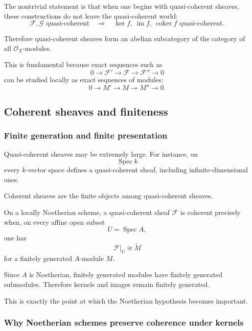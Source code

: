 The nontrivial statement is that when one begins with quasi-coherent sheaves, these constructions do not leave the quasi-coherent world:
\[
\mathcal{F},\mathcal{G}\text{ quasi-coherent}
\quad\Longrightarrow\quad
\ker f,\ \operatorname{im} f,\ \operatorname{coker} f\text{ quasi-coherent}.
\]

Therefore quasi-coherent sheaves form an abelian subcategory of the category of all \(\mathcal{O}_X\)-modules.

This is fundamental because exact sequences such as
\[
0\longrightarrow\mathcal{F}'
\longrightarrow\mathcal{F}
\longrightarrow\mathcal{F}''
\longrightarrow 0
\]
can be studied locally as exact sequences of modules:
\[
0\longrightarrow M'
\longrightarrow M
\longrightarrow M''
\longrightarrow 0.
\]

\subsection{Coherent sheaves and finiteness}

\subsubsection{Finite generation and finite presentation}

Quasi-coherent sheaves may be extremely large. For instance, on
\[
\operatorname{Spec} k
\]
every \(k\)-vector space defines a quasi-coherent sheaf, including infinite-dimensional ones.

Coherent sheaves are the finite objects among quasi-coherent sheaves.

On a locally Noetherian scheme, a quasi-coherent sheaf \(\mathcal{F}\) is coherent precisely when, on every affine open subset
\[
U=\operatorname{Spec} A,
\]
one has
\[
\mathcal{F}|_U\cong\widetilde{M}
\]
for a finitely generated \(A\)-module \(M\).

Since \(A\) is Noetherian, finitely generated modules have finitely generated submodules. Therefore kernels and images remain finitely generated.

This is exactly the point at which the Noetherian hypothesis becomes important.

\subsubsection{Why Noetherian schemes preserve coherence under kernels}

